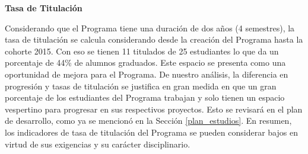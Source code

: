 \noindent\textbf{Tasa de Titulación}

Considerando que el Programa tiene una duración de dos años (4 semestres),
la tasa de titulación se calcula considerando desde la creación del Programa hasta la cohorte 2015. Con
eso se tienen 11 titulados de 25 estudiantes lo que da un porcentaje de 44\% de alumnos graduados.
Este espacio se presenta
como una oportunidad de mejora para el Programa. De nuestro análisis, la diferencia en progresión
y tasas de titulación se justifica en gran medida en que un gran porcentaje de los estudiantes del 
Programa trabajan y solo tienen un espacio vespertino para progresar en sus respectivos proyectos.
Esto se revisará en el plan de desarrollo, como ya se mencionó en la Sección \ref{plan_estudios}. 
En resumen, los indicadores de tasa de titulación del Programa se pueden considerar bajos
en virtud de sus exigencias y su carácter disciplinario.




